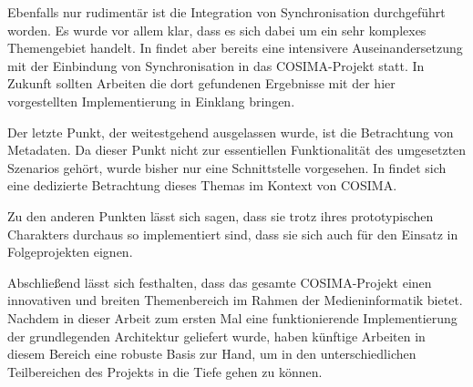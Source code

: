   Ebenfalls nur rudimentär ist die Integration von Synchronisation durchgeführt worden. Es wurde vor allem klar, dass es sich dabei um ein sehr komplexes Themengebiet handelt. In \citep{antons09} findet aber bereits eine intensivere Auseinandersetzung mit der Einbindung von Synchronisation in das COSIMA-Projekt statt. In Zukunft sollten Arbeiten die dort gefundenen Ergebnisse mit der hier vorgestellten Implementierung in Einklang bringen.
  
  Der letzte Punkt, der weitestgehend ausgelassen wurde, ist die Betrachtung von Metadaten. Da dieser Punkt nicht zur essentiellen Funktionalität des umgesetzten Szenarios gehört, wurde bisher nur eine Schnittstelle vorgesehen. In \citep{lehmann09} findet sich eine dedizierte Betrachtung dieses Themas im Kontext von COSIMA.
  
  Zu den anderen Punkten lässt sich sagen, dass sie trotz ihres prototypischen Charakters durchaus so implementiert sind, dass sie sich auch für den Einsatz in Folgeprojekten eignen.
  
  Abschließend lässt sich festhalten, dass das gesamte COSIMA-Projekt einen innovativen und breiten Themenbereich im Rahmen der Medieninformatik bietet. Nachdem in dieser Arbeit zum ersten Mal eine funktionierende Implementierung der grundlegenden Architektur geliefert wurde, haben künftige Arbeiten in diesem Bereich eine robuste Basis zur Hand, um in den unterschiedlichen Teilbereichen des Projekts in die Tiefe gehen zu können.

